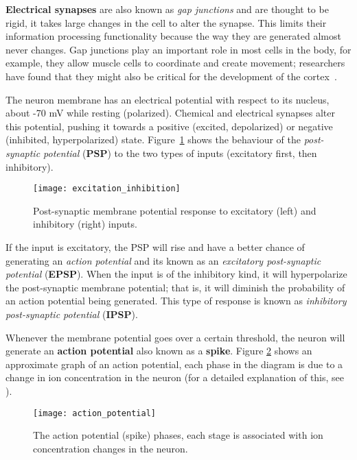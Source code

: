 \textbf{Electrical synapses} are also known as \emph{gap junctions} and are thought to be rigid, it takes large changes in the cell to alter the synapse. This limits their information processing functionality because the way they are generated almost never changes. Gap junctions play an important role in most cells in the body, for example, they allow muscle cells to coordinate and create movement; researchers have found that they might also be critical for the development of the cortex~\cite{gap-junctions-pmid20066080,thompson2000brain}. 

The neuron membrane has an electrical potential with respect to its nucleus, about -70 mV while resting (polarized). Chemical and electrical synapses alter this potential, pushing it towards a positive (excited, depolarized) or negative (inhibited, hyperpolarized) state. Figure~\ref{fig:neuro:exc_inh} shows the behaviour of the \emph{post-synaptic potential} (\textbf{PSP}) to the two types of inputs (excitatory first, then inhibitory). 

\begin{figure}[hbt]
  \begin{center}
    \texttt{[image: excitation\_inhibition]}
    \caption{Post-synaptic membrane potential response to excitatory (left) and inhibitory (right) inputs.}
    \label{fig:neuro:exc_inh}
  \end{center}
\end{figure}

If the input is excitatory, the PSP will rise and have a better chance of generating an \emph{action potential} and its known as an \emph{excitatory post-synaptic potential} (\textbf{EPSP}). When the input is of the inhibitory kind, it will hyperpolarize the post-synaptic membrane potential; that is, it will diminish the probability of an action potential being generated. This type of response is known as \emph{inhibitory post-synaptic potential} (\textbf{IPSP}).

Whenever the membrane potential goes over a certain threshold, the neuron will generate an \textbf{action potential} also known as a \textbf{spike}. Figure \ref{fig:neuro:spike} shows an approximate graph of an action potential, each phase in the diagram is due to a change in ion concentration in the neuron (for a detailed explanation of this, see \cite{thompson2000brain}).

\begin{figure}[hbt]
  \begin{center}
    \texttt{[image: action\_potential]}
    \caption{The action potential (spike) phases, each stage is associated with ion concentration changes in the neuron.}
    \label{fig:neuro:spike}
  \end{center}
\end{figure}

